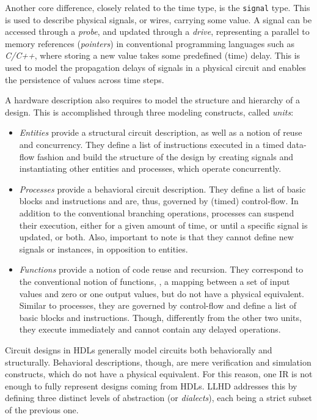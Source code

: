 Another core difference, closely related to the time type, is the \texttt{signal} type. This is used to describe physical signals, or wires, carrying some value. A signal can be accessed through a \textit{probe}, and updated through a \textit{drive}, representing a parallel to memory references (\textit{pointers}) in conventional programming languages such as \textit{C/C++}, where storing a new value takes some predefined (time) delay. This is used to model the propagation delays of signals in a physical circuit and enables the persistence of values across time steps.

A hardware description also requires to model the structure and hierarchy of a design. This is accomplished through three modeling constructs, called \textit{units}:
\begin{itemize}
    \item \textit{Entities} provide a structural circuit description, as well as a notion of reuse and concurrency. They define a list of instructions executed in a timed data-flow fashion and build the structure of the design by creating signals and instantiating other entities and processes, which operate concurrently.
    \item \textit{Processes} provide a behavioral circuit description. They define a list of basic blocks and instructions and are, thus, governed by (timed) control-flow. In addition to the conventional branching operations, processes can suspend their execution, either for a given amount of time, or until a specific signal is updated, or both. Also, important to note is that they cannot define new signals or instances, in opposition to entities.
    \item \textit{Functions} provide a notion of code reuse and recursion. They correspond to the conventional notion of functions, \ie, a mapping between a set of input values and zero or one output values, but do not have a physical equivalent. Similar to processes, they are governed by control-flow and define a list of basic blocks and instructions. Though, differently from the other two units, they execute immediately and cannot contain any delayed operations.
\end{itemize}


Circuit designs in HDLs generally model circuits both behaviorally and structurally. Behavioral descriptions, though, are mere verification and simulation constructs, which do not have a physical equivalent. For this reason, one IR is not enough to fully represent designs coming from HDLs. LLHD addresses this by defining three distinct levels of abstraction (or \textit{dialects}), each being a strict subset of the previous one.

